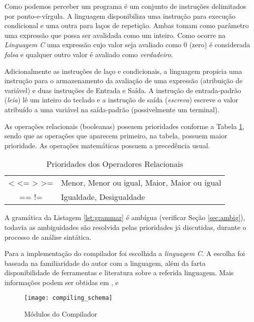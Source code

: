 Como podemos perceber um programa é um conjunto de instruções delimitados por
ponto-e-vírgula. A linguagem disponibiliza uma instrução para execução
condicional e uma outra para laços de repetição. Ambas tomam como parâmetro
uma expressão que possa ser avalidada como um inteiro. Como ocorre na
\emph{Linguagem C} uma expressão cujo valor seja avaliado como 0 (zero) é
considerada \emph{falsa} e qualquer outro valor é avaliado como
\emph{verdadeiro}.

Adicionalmente as instruções de laço e condicionais, a linguagem propicia uma
instrução para o armazenamento da avaliação de uma expressão (atribuição de
variável) e duas instruções de Entrada e Saída. A instrução de entrada-padrão
(\emph{leia}) lê um inteiro do teclado e a instrução de saída (\emph{escreva})
escreve o valor atribuído a uma variável na saída-padrão (possivelmente um
terminal).

As operações relacionais (booleanas) possuem prioridades conforme a Tabela
\ref{tab:prioridades}, sendo que as operações que aparecem primeiro, na
tabela, possuem maior prioridade. As operações matemáticas possuem a
precedência usual.

\begin{table}[htb]
	\begin{center}
		\begin{tabular}{c l}
			< <= > >= & Menor, Menor ou igual, Maior, Maior ou igual \\
			== !=      & Igualdade,  Desigualdade \\
		\end{tabular}
	\end{center}
	\caption{Prioridades dos Operadores Relacionais}
	\label{tab:prioridades}
\end{table}

A gramática da Listagem \ref{lst:grammar} é ambígua (verificar Seção
\ref{sec:ambig}), todavia as ambiguidades são resolvida pelas prioridades já
discutidas, durante o processo de análise sintática.

Para a implementação do compilador foi escolhida a \emph{linguagem C}. A
escolha foi baseada na familiaridade do autor com a linguagem, além da farta
disponibilidade de ferramentas e literatura sobre a referida linguagem. Mais
informações podem ser obtidas em ,  e

\begin{figure}[htb]
	\centering
	\texttt{[image: compiling\_schema]}
	\caption{Módulos do Compilador}
	\label{fig:compiler_schema}
\end{figure}

